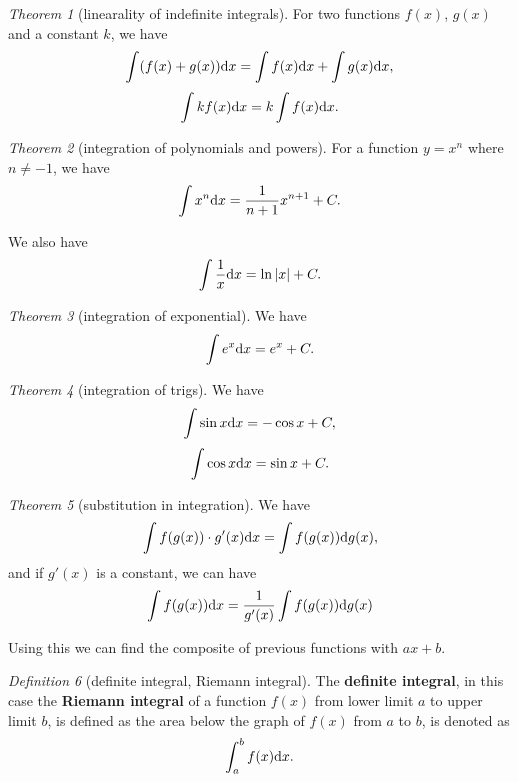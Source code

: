 \documentclass[8pt]{article}
\theoremstyle{remark}
\newtheorem{theorem}{Theorem}[section]
\newtheorem{definition}[theorem]{Definition}
\begin{document}
            \begin{theorem}[linearality of indefinite integrals]
                For two functions $f(x)$, $g(x)$ and a constant $k$, we have
                $$
                    \int (f(x) + g(x)) \mathrm{d} x = \int f(x) \mathrm{d} x + \int g(x) \mathrm{d} x,
                $$
                $$
                    \int k f(x) \mathrm{d} x = k \int f(x) \mathrm{d} x.
                $$
            \end{theorem}

            \begin{theorem}[integration of polynomials and powers]
                For a function $y = x^n$ where $n \neq -1$, we have
                $$
                    \int x^n \mathrm{d} x = \frac{1}{n + 1} x^{n + 1} + C.
                $$

                We also have
                $$
                    \int \frac{1}{x} \mathrm{d} x = \ln \left\lvert x \right\rvert + C.
                $$
            \end{theorem}

            \begin{theorem}[integration of exponential]
                We have
                $$
                    \int e^x \mathrm{d} x = e^x + C.
                $$
            \end{theorem}

            \begin{theorem}[integration of trigs]
                We have
                $$
                    \int \sin x \mathrm{d} x = - \cos x + C,
                $$
                $$
                    \int \cos x \mathrm{d} x = \sin x + C.
                $$
            \end{theorem}

            \begin{theorem}[substitution in integration]
                We have
                $$
                    \int f(g(x)) \cdot g'(x) \mathrm{d} x = \int f(g(x)) \mathrm{d} g(x),
                $$
                and if $g'(x)$ is a constant, we can have
                $$
                    \int f(g(x)) \mathrm{d} x = \frac{1}{g'(x)} \int f(g(x)) \mathrm{d} g(x)
                $$

                Using this we can find the composite of previous functions with $ax + b$.
            \end{theorem}

            \begin{definition}[definite integral, Riemann integral]
                The \textbf{definite integral}, in this case the \textbf{Riemann integral} of a function $f(x)$ from lower limit $a$ to upper limit $b$, is defined as the area below the graph of $f(x)$ from $a$ to $b$, is denoted as
                $$
                    \int_{a}^{b} f(x) \mathrm{d} x.
                $$
            \end{definition}
            
\end{document}
